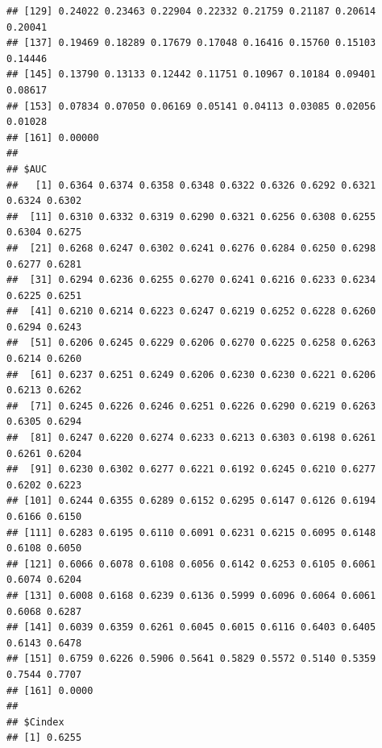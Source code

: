 \documentclass{article}\usepackage[]{graphicx}\usepackage[]{color}
\makeatletter
\newenvironment{kframe}{%
 \def\at@end@of@kframe{}%
 \ifinner\ifhmode%
  \def\at@end@of@kframe{\end{minipage}}%
  \begin{minipage}{\columnwidth}%
 \fi\fi%
 \def\FrameCommand##1{\hskip\@totalleftmargin \hskip-\fboxsep
 \colorbox{shadecolor}{##1}\hskip-\fboxsep
     \hskip-\linewidth \hskip-\@totalleftmargin \hskip\columnwidth}%
 \MakeFramed {\advance\hsize-\width
   \@totalleftmargin\z@ \linewidth\hsize
   \@setminipage}}%
 {\par\unskip\endMakeFramed%
 \at@end@of@kframe}
\newenvironment{knitrout}{}{} %
\makeatother
\begin{document}
\begin{knitrout}
\begin{kframe}
\begin{verbatim}
## [129] 0.24022 0.23463 0.22904 0.22332 0.21759 0.21187 0.20614 0.20041
## [137] 0.19469 0.18289 0.17679 0.17048 0.16416 0.15760 0.15103 0.14446
## [145] 0.13790 0.13133 0.12442 0.11751 0.10967 0.10184 0.09401 0.08617
## [153] 0.07834 0.07050 0.06169 0.05141 0.04113 0.03085 0.02056 0.01028
## [161] 0.00000
## 
## $AUC
##   [1] 0.6364 0.6374 0.6358 0.6348 0.6322 0.6326 0.6292 0.6321 0.6324 0.6302
##  [11] 0.6310 0.6332 0.6319 0.6290 0.6321 0.6256 0.6308 0.6255 0.6304 0.6275
##  [21] 0.6268 0.6247 0.6302 0.6241 0.6276 0.6284 0.6250 0.6298 0.6277 0.6281
##  [31] 0.6294 0.6236 0.6255 0.6270 0.6241 0.6216 0.6233 0.6234 0.6225 0.6251
##  [41] 0.6210 0.6214 0.6223 0.6247 0.6219 0.6252 0.6228 0.6260 0.6294 0.6243
##  [51] 0.6206 0.6245 0.6229 0.6206 0.6270 0.6225 0.6258 0.6263 0.6214 0.6260
##  [61] 0.6237 0.6251 0.6249 0.6206 0.6230 0.6230 0.6221 0.6206 0.6213 0.6262
##  [71] 0.6245 0.6226 0.6246 0.6251 0.6226 0.6290 0.6219 0.6263 0.6305 0.6294
##  [81] 0.6247 0.6220 0.6274 0.6233 0.6213 0.6303 0.6198 0.6261 0.6261 0.6204
##  [91] 0.6230 0.6302 0.6277 0.6221 0.6192 0.6245 0.6210 0.6277 0.6202 0.6223
## [101] 0.6244 0.6355 0.6289 0.6152 0.6295 0.6147 0.6126 0.6194 0.6166 0.6150
## [111] 0.6283 0.6195 0.6110 0.6091 0.6231 0.6215 0.6095 0.6148 0.6108 0.6050
## [121] 0.6066 0.6078 0.6108 0.6056 0.6142 0.6253 0.6105 0.6061 0.6074 0.6204
## [131] 0.6008 0.6168 0.6239 0.6136 0.5999 0.6096 0.6064 0.6061 0.6068 0.6287
## [141] 0.6039 0.6359 0.6261 0.6045 0.6015 0.6116 0.6403 0.6405 0.6143 0.6478
## [151] 0.6759 0.6226 0.5906 0.5641 0.5829 0.5572 0.5140 0.5359 0.7544 0.7707
## [161] 0.0000
## 
## $Cindex
## [1] 0.6255
\end{verbatim}
\end{kframe}
\end{knitrout}
\end{document}

